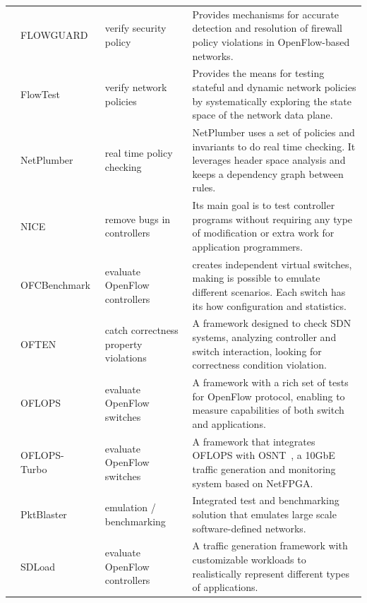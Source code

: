 {\begin{table}[!htp]
\begin{center}
\begin{tabularx}{\linewidth}{p{1.2cm}p{2.5cm}p{3.5cm}X}
& FLOWGUARD~\cite{Hu2014_4} & verify security policy & Provides mechanisms for accurate detection and resolution of firewall policy violations in OpenFlow-based networks.\\

& FlowTest~\cite{Fayaz2014_4} & verify network policies & Provides the means for testing stateful and dynamic network policies by systematically exploring the state space of the network data plane. \\

& NetPlumber~\cite{kazemian2013} & real time policy checking & NetPlumber uses a set of policies and invariants to do real time checking. It leverages header space analysis and keeps a dependency graph between rules.\\
& NICE~\cite{canini2012-1} & remove bugs in controllers & Its main goal is to test controller programs without requiring any type of modification or extra work for application programmers. \\
& OFCBenchmark~\cite{jarschel2012} & evaluate OpenFlow controllers & creates independent virtual switches, making is possible to emulate different scenarios. Each switch has its how configuration and statistics.\\
& OFTEN~\cite{kuzniar2012} & catch correctness property violations & A framework designed to check SDN systems, analyzing controller and switch interaction, looking for correctness condition violation. \\
 & OFLOPS~\cite{rotsos2012-1} & evaluate OpenFlow switches & A framework with a rich set of tests for OpenFlow protocol, enabling to measure capabilities of both switch and applications. \\

& OFLOPS-Turbo~\cite{Rotsos2014} & evaluate OpenFlow switches & A framework that integrates OFLOPS with OSNT~\cite{Shahbaz2013}, a 10GbE traffic generation and monitoring system based on NetFPGA. \\

& PktBlaster~\cite{veryxtech} & emulation / benchmarking & Integrated test and benchmarking solution that emulates large scale software-defined networks.\\

& SDLoad~\cite{Laurent2014_4} & evaluate OpenFlow controllers & A traffic generation framework with customizable workloads to realistically represent different types of applications. \\


\end{tabularx}
\end{center}
\end{table}}
